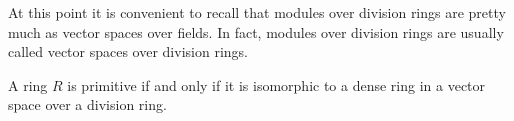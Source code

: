 %
%
%
%

At this point it is convenient to recall that
modules over division rings are pretty much as vector spaces over fields. In fact, 
modules over division rings are usually called vector spaces over division rings. 

\begin{theorem}[Jacobson]
	\label{thm:density}
	A ring $R$ is primitive if and only if it is isomorphic to a dense ring in 
	a vector space over a division ring.
\end{theorem}

